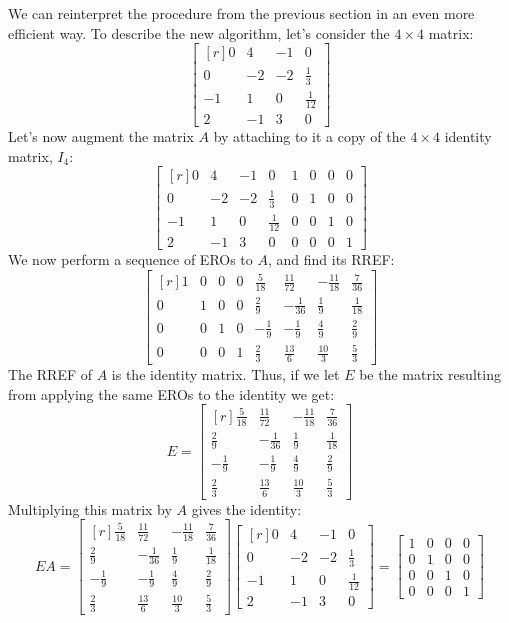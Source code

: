 \documentclass[12pt]{article}
\begin{document}
We can reinterpret the procedure from the previous section in an even more efficient way. To describe the new algorithm, let's consider the $4\times 4$ matrix:
\[
\left[\begin{matrix*}[r]0 & 4 & -1 & 0\\0 & -2 & -2 & \frac{1}{3}\\-1 & 1 & 0 & \frac{1}{12}\\2 & -1 & 3 & 0\end{matrix*}\right]
\]
Let's now augment the matrix $A$ by attaching to it a copy of the $4\times 4$ identity matrix, $I_4$:
\[
\left[\begin{matrix*}[r]0 & 4 & -1 & 0 & 1 & 0 & 0 & 0\\0 & -2 & -2 & \frac{1}{3} & 0 & 1 & 0 & 0\\-1 & 1 & 0 & \frac{1}{12} & 0 & 0 & 1 & 0\\2 & -1 & 3 & 0 & 0 & 0 & 0 & 1\end{matrix*}\right]
\]
We now perform a sequence of EROs to $A$, and find its RREF:
\[
\left[\begin{matrix*}[r]1 & 0 & 0 & 0 & \frac{5}{18} & \frac{11}{72} & - \frac{11}{18} & \frac{7}{36}\\0 & 1 & 0 & 0 & \frac{2}{9} & - \frac{1}{36} & \frac{1}{9} & \frac{1}{18}\\0 & 0 & 1 & 0 & - \frac{1}{9} & - \frac{1}{9} & \frac{4}{9} & \frac{2}{9}\\0 & 0 & 0 & 1 & \frac{2}{3} & \frac{13}{6} & \frac{10}{3} & \frac{5}{3}\end{matrix*}\right]
\]
The RREF of $A$ is the identity matrix. Thus, if we let $E$ be the matrix resulting from applying the same EROs to the identity we get:
\[
E=\left[\begin{matrix*}[r]\frac{5}{18} & \frac{11}{72} & - \frac{11}{18} & \frac{7}{36}\\\frac{2}{9} & - \frac{1}{36} & \frac{1}{9} & \frac{1}{18}\\- \frac{1}{9} & - \frac{1}{9} & \frac{4}{9} & \frac{2}{9}\\\frac{2}{3} & \frac{13}{6} & \frac{10}{3} & \frac{5}{3}\end{matrix*}\right]
\]
Multiplying this matrix by $A$ gives the identity:
\[
EA=
\left[\begin{matrix*}[r]\frac{5}{18} & \frac{11}{72} & - \frac{11}{18} & \frac{7}{36}\\\frac{2}{9} & - \frac{1}{36} & \frac{1}{9} & \frac{1}{18}\\- \frac{1}{9} & - \frac{1}{9} & \frac{4}{9} & \frac{2}{9}\\\frac{2}{3} & \frac{13}{6} & \frac{10}{3} & \frac{5}{3}\end{matrix*}\right]
\left[\begin{matrix*}[r]0 & 4 & -1 & 0\\0 & -2 & -2 & \frac{1}{3}\\-1 & 1 & 0 & \frac{1}{12}\\2 & -1 & 3 & 0\end{matrix*}\right]
=\begin{bmatrix}1&0&0&0\\0&1&0&0\\0&0&1&0\\0&0&0&1\end{bmatrix}
\]
\end{document}
